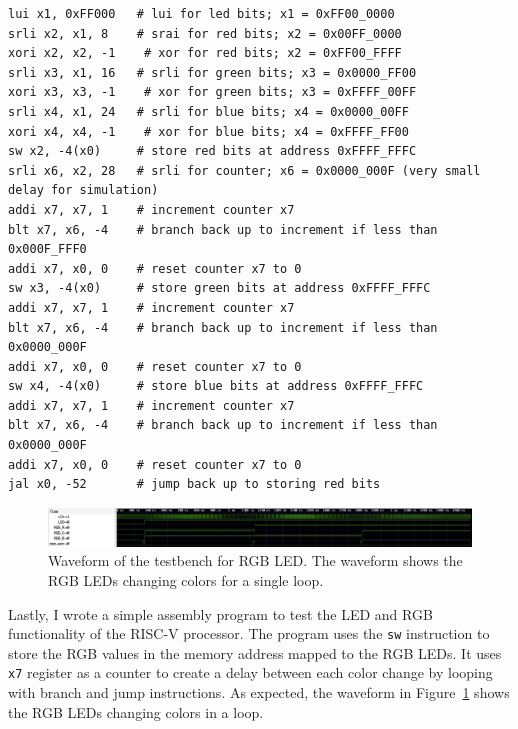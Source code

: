\begin{verbatim}
lui x1, 0xFF000   # lui for led bits; x1 = 0xFF00_0000
srli x2, x1, 8    # srai for red bits; x2 = 0x00FF_0000
xori x2, x2, -1    # xor for red bits; x2 = 0xFF00_FFFF
srli x3, x1, 16   # srli for green bits; x3 = 0x0000_FF00
xori x3, x3, -1    # xor for green bits; x3 = 0xFFFF_00FF
srli x4, x1, 24   # srli for blue bits; x4 = 0x0000_00FF
xori x4, x4, -1    # xor for blue bits; x4 = 0xFFFF_FF00
sw x2, -4(x0)     # store red bits at address 0xFFFF_FFFC
srli x6, x2, 28   # srli for counter; x6 = 0x0000_000F (very small delay for simulation)
addi x7, x7, 1    # increment counter x7
blt x7, x6, -4    # branch back up to increment if less than 0x000F_FFF0
addi x7, x0, 0    # reset counter x7 to 0
sw x3, -4(x0)     # store green bits at address 0xFFFF_FFFC
addi x7, x7, 1    # increment counter x7
blt x7, x6, -4    # branch back up to increment if less than 0x0000_000F
addi x7, x0, 0    # reset counter x7 to 0
sw x4, -4(x0)     # store blue bits at address 0xFFFF_FFFC
addi x7, x7, 1    # increment counter x7
blt x7, x6, -4    # branch back up to increment if less than 0x0000_000F
addi x7, x0, 0    # reset counter x7 to 0
jal x0, -52       # jump back up to storing red bits
\end{verbatim}

\begin{figure}[H]
    \centering
    \includegraphics[width=\textwidth]{media/rgb_waveform}
    \caption{Waveform of the testbench for RGB LED. The waveform shows the RGB LEDs changing colors for a single loop.}
    \label{fig:rgb_waveform}
\end{figure}

Lastly, I wrote a simple assembly program to test the LED and RGB functionality of the RISC-V processor.
The program uses the \texttt{sw} instruction to store the RGB values in the memory address mapped to the RGB LEDs.
It uses \texttt{x7} register as a counter to create a delay between each color change by looping with branch and jump instructions.
As expected, the waveform in Figure~\ref{fig:rgb_waveform} shows the RGB LEDs changing colors in a loop.
